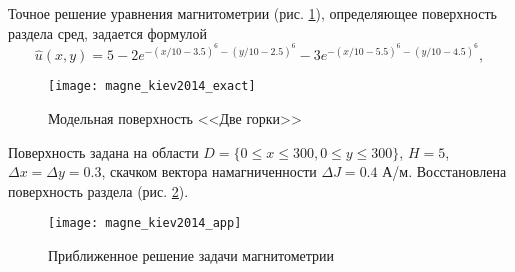 Точное решение уравнения магнитометрии (рис. \ref{fig:magne_kiev2014_exact}), определяющее поверхность раздела сред, задается формулой
$$\hat{u}(x,y)=5-2e^{-(x/10-3.5)^6-(y/10-2.5)^6}-3e^{-(x/10-5.5)^6-(y/10-4.5)^6},$$
\begin{figure}[H]
	\centering
	\texttt{[image: magne\_kiev2014\_exact]}
	\caption{Модельная поверхность <<Две горки>>}
	\label{fig:magne_kiev2014_exact}
\end{figure}
Поверхность задана на области $D=\{0\le x\le 300, 0\le y\le 300\}$, $H=5$, $\Delta x=\Delta y=0.3$, скачком вектора намагниченности $\Delta J=0.4$ А/м. Восстановлена поверхность раздела (рис. \ref{fig:magne_kiev2014_app}). 
\begin{figure}[H]
	\centering
	\texttt{[image: magne\_kiev2014\_app]}
	\caption{Приближенное решение задачи магнитометрии}
	\label{fig:magne_kiev2014_app}
\end{figure}


